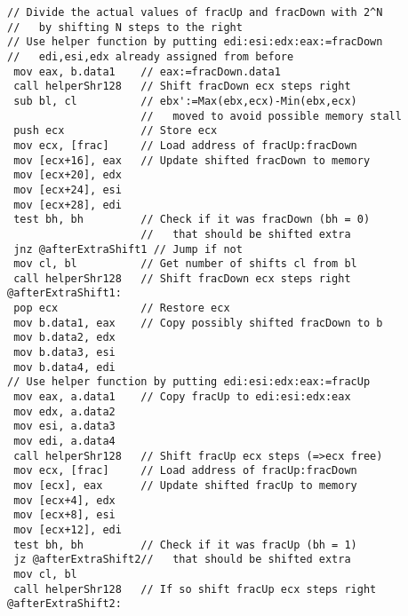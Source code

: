 \begin{multicols}{2}
{\begin{verbatim}
// Divide the actual values of fracUp and fracDown with 2^N
//   by shifting N steps to the right
// Use helper function by putting edi:esi:edx:eax:=fracDown
//   edi,esi,edx already assigned from before
 mov eax, b.data1    // eax:=fracDown.data1
 call helperShr128   // Shift fracDown ecx steps right
 sub bl, cl          // ebx':=Max(ebx,ecx)-Min(ebx,ecx)
                     //   moved to avoid possible memory stall
 push ecx            // Store ecx
 mov ecx, [frac]     // Load address of fracUp:fracDown
 mov [ecx+16], eax   // Update shifted fracDown to memory
 mov [ecx+20], edx
 mov [ecx+24], esi
 mov [ecx+28], edi
 test bh, bh         // Check if it was fracDown (bh = 0)
                     //   that should be shifted extra
 jnz @afterExtraShift1 // Jump if not
 mov cl, bl          // Get number of shifts cl from bl
 call helperShr128   // Shift fracDown ecx steps right
@afterExtraShift1:
 pop ecx             // Restore ecx
 mov b.data1, eax    // Copy possibly shifted fracDown to b
 mov b.data2, edx
 mov b.data3, esi
 mov b.data4, edi
// Use helper function by putting edi:esi:edx:eax:=fracUp
 mov eax, a.data1    // Copy fracUp to edi:esi:edx:eax
 mov edx, a.data2
 mov esi, a.data3
 mov edi, a.data4
 call helperShr128   // Shift fracUp ecx steps (=>ecx free)
 mov ecx, [frac]     // Load address of fracUp:fracDown
 mov [ecx], eax      // Update shifted fracUp to memory
 mov [ecx+4], edx
 mov [ecx+8], esi
 mov [ecx+12], edi
 test bh, bh         // Check if it was fracUp (bh = 1)
 jz @afterExtraShift2//   that should be shifted extra
 mov cl, bl
 call helperShr128   // If so shift fracUp ecx steps right
@afterExtraShift2:


\end{verbatim}}
\end{multicols}
